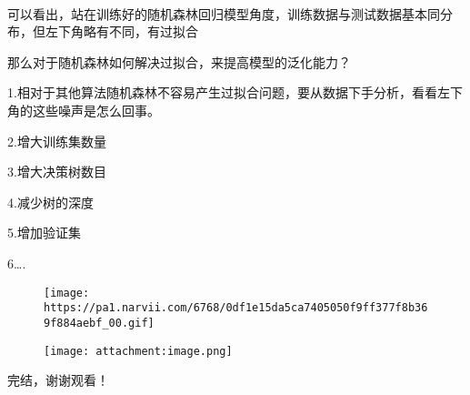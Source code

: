 \documentclass[11pt]{article}
\makeatletter
\def\maxwidth{\ifdim\Gin@nat@width>\linewidth\linewidth
    \else\Gin@nat@width\fi}
\let\Oldincludegraphics\includegraphics
\renewcommand{\includegraphics}[1]{\Oldincludegraphics[width=.8\maxwidth]{#1}}
\makeatother
\begin{document}
    \begin{center}
    \end{center}
    { \hspace*{\fill} \\}
    
    可以看出，站在训练好的随机森林回归模型角度，训练数据与测试数据基本同分布，但左下角略有不同，有过拟合

    那么对于随机森林如何解决过拟合，来提高模型的泛化能力？

1.相对于其他算法随机森林不容易产生过拟合问题，要从数据下手分析，看看左下角的这些噪声是怎么回事。

2.增大训练集数量

3.增大决策树数目

4.减少树的深度

5.增加验证集

6\ldots{}.

    \begin{figure}
\centering
\texttt{[image: https://pa1.narvii.com/6768/0df1e15da5ca7405050f9ff377f8b369f884aebf\_00.gif]}
\caption{\texttt{[image: attachment:image.png]}}
\end{figure}

    完结，谢谢观看！


    
    
    
    
\end{document}
